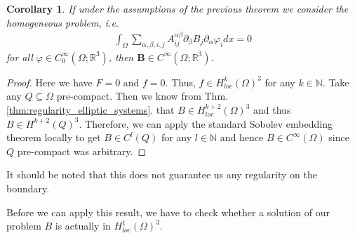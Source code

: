 \documentclass[12pt,a4paper]{article}
\numberwithin{equation}{subsection}
\numberwithin{lemma}{subsection}
\newtheorem{corollary}[lemma]{Corollary}
\theoremstyle{definition}
\newcommand{\naturalnum}{\mathbb{N}}
\newcommand{\real}{\mathbb{R}}
\begin{document}
\begin{corollary}\label{cor:smooth_solution}
    If under the assumptions of the previous theorem we consider the 
    homogeneous problem, i.e.
    \begin{align*}
        \int_\Omega \sum\limits_{\alpha,\beta,i,j} 
        A_{ij}^{\alpha \beta} \partial_\beta B_j \partial_\alpha \varphi_i dx =0
    \end{align*}
    for all $\varphi \in C^\infty_0(\Omega;\real^3)$, then $\mathbf{B}\in C^\infty(\Omega;\real^3)$.
\end{corollary}
\begin{proof}
    Here we have $F= 0$ and $f = 0$. Thus, $f \in H^k_{loc}(\Omega)^3$ 
    for any $k \in \naturalnum$. 
    Take any $Q \subseteq \Omega$ pre-compact. Then we know from 
    Thm.\,\ref{thm:regularity_elliptic_systems}.
    that $B \in H_{loc}^{k+2}(\Omega)^3$ and thus $B \in H^{k+2}(Q)^3$.
    Therefore, we can apply the 
    standard Sobolev embedding theorem locally to get $B \in C^l(Q)$ for any 
    $l \in \naturalnum$ and hence $B \in C^\infty(\Omega)$ since $Q$ pre-compact
    was arbitrary. 
\end{proof}
It should be noted that this does not guarantee us any regularity on the 
boundary. 

Before we can apply this result, we have to check whether a solution of our 
problem $B$ is actually in $H^1_{loc}(\Omega)^3$. 
\end{document}
